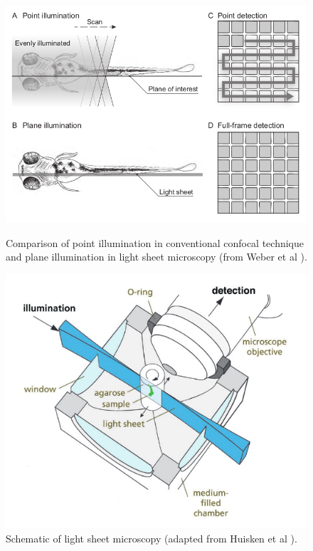 \begin{figure}[h!]
\begin{minipage}[b]{0.55\textwidth}
\centering
\includegraphics[width=\columnwidth]{Exp_1_Lightsheet/Figures/lightsheetconcomp}
\caption{Comparison of point illumination in conventional confocal technique and plane illumination in light sheet microscopy (from Weber et al \cite{Weber2014}).}
\label{fig:lsccomp}
\end{minipage}\hfill
\begin{minipage}[b]{0.4\textwidth}
\centering
\includegraphics[width=\columnwidth]{Exp_1_Lightsheet/Figures/LSscheme2}
\caption{Schematic of light sheet microscopy (adapted from Huisken et al \cite{Huisken2004}).}
\label{fig:lsscheme}
\end{minipage}
\end{figure}

